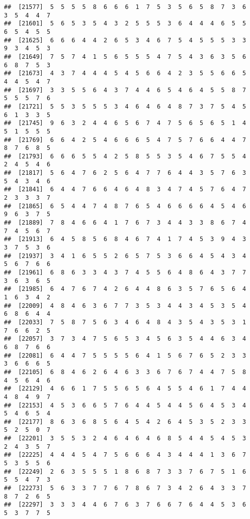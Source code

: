 \documentclass[
]{book}
\begin{document}
\begin{verbatim}
##  [21577]  5  5  5  5  8  6  6  6  1  7  5  3  5  6  5  8  7  3  6  3  5  4  4  7
##  [21601]  5  6  5  3  5  4  3  2  5  5  5  3  6  4  4  4  6  5  5  6  5  4  5  5
##  [21625]  6  6  6  4  4  2  6  5  3  4  6  7  5  4  5  5  5  3  3  9  3  4  5  3
##  [21649]  7  5  7  4  1  5  6  5  5  5  4  7  5  4  3  6  3  5  6  6  8  7  5  3
##  [21673]  4  3  7  4  4  4  5  4  5  6  6  4  2  3  5  5  6  6  5  4  4  5  4  7
##  [21697]  3  3  5  5  6  4  3  7  4  4  6  5  4  6  4  5  5  8  7  5  5  5  7  6
##  [21721]  5  5  3  5  5  5  3  4  6  4  6  4  8  7  3  7  5  4  5  6  1  3  3  5
##  [21745]  9  6  3  2  4  4  6  5  6  7  4  7  5  6  5  6  5  1  4  5  1  5  5  5
##  [21769]  6  6  4  2  5  4  6  6  6  5  4  7  5  7  6  6  4  4  7  8  7  6  8  5
##  [21793]  6  6  6  5  5  4  2  5  8  5  5  3  5  4  6  7  5  5  4  2  4  5  4  6
##  [21817]  5  6  4  7  6  2  5  6  4  7  7  6  4  4  3  5  7  6  3  5  4  3  4  6
##  [21841]  6  4  4  7  6  6  4  6  4  8  3  4  7  4  5  7  6  4  7  2  3  3  3  7
##  [21865]  6  5  4  4  7  4  8  7  6  5  4  6  6  6  6  4  5  4  6  9  6  3  7  5
##  [21889]  7  8  4  6  6  4  1  7  6  7  3  4  4  3  3  8  6  7  4  7  4  5  6  7
##  [21913]  6  4  5  8  5  6  8  4  6  7  4  1  7  4  5  3  9  4  3  3  7  5  3  6
##  [21937]  3  4  1  6  5  5  2  6  5  7  5  3  6  6  4  5  4  3  4  5  6  7  6  6
##  [21961]  6  8  6  3  3  4  3  7  4  5  5  6  4  8  6  4  3  7  7  3  6  3  6  5
##  [21985]  6  4  7  6  7  4  2  6  4  4  8  6  3  5  7  6  5  6  4  1  6  3  4  2
##  [22009]  4  8  4  6  3  6  7  7  3  5  3  4  4  3  4  5  3  5  4  6  8  6  4  4
##  [22033]  7  5  8  7  5  6  3  4  6  4  8  4  3  5  4  3  5  3  1  7  6  6  2  5
##  [22057]  3  7  3  4  7  5  6  5  3  4  5  6  3  5  4  4  6  3  4  6  8  7  6  6
##  [22081]  6  4  4  7  5  5  5  5  6  4  1  5  6  7  6  5  2  3  3  3  6  6  6  5
##  [22105]  6  8  4  6  2  6  4  6  3  3  6  7  6  7  4  4  7  5  8  4  5  6  4  6
##  [22129]  4  6  6  1  7  5  5  6  5  6  4  5  5  4  6  1  7  4  4  4  8  4  9  7
##  [22153]  4  5  3  6  6  5  7  6  4  4  5  4  4  5  6  4  5  3  4  5  4  6  5  4
##  [22177]  8  6  3  6  8  5  6  4  5  4  2  6  4  5  3  5  2  3  3  5  2  5  0  7
##  [22201]  3  5  5  3  2  4  6  4  6  4  6  8  5  4  4  5  4  5  3  2  4  3  5  7
##  [22225]  4  4  4  5  4  7  5  6  6  6  4  3  4  4  4  1  3  6  7  5  3  5  5  6
##  [22249]  2  6  3  5  5  5  1  8  6  8  7  3  3  7  6  7  5  1  6  5  5  4  7  3
##  [22273]  5  6  3  3  7  7  6  7  8  6  7  3  4  2  6  4  3  3  7  8  7  2  6  5
##  [22297]  3  3  3  4  4  6  7  6  3  7  6  6  7  6  4  4  5  3  6  5  3  7  7  5

\end{verbatim}
\end{document}
